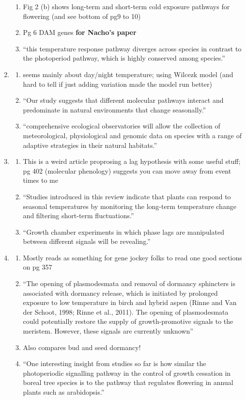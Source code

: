 \documentclass[11pt,letter]{article}
\begin{document}
\begin{enumerate}
\begin{enumerate}
\item Fig 2 (b) shows long-term and short-term cold exposure pathways for flowering (and see bottom of pg9 to 10)
\item Pg 6 DAM genes {\bf for Nacho's paper}
\item ``this temperature response pathway diverges across species in contrast to the photoperiod pathway, which is highly conserved among species.''
\end{enumerate} 
\item \cite{Chew:2012pd} 
\begin{enumerate} 
\item seems mainly about day/night temperature; using Wilcezk model (and hard to tell if just adding variation made the model run better) 
\item ``Our study suggests that different molecular pathways interact and predominate in natural environments that change seasonally.''
\item ``comprehensive ecological observatories will allow the collection of meteorological, physiological and genomic data on species with a range of adaptive strategies in their natural habitats.''
\end{enumerate} 
\item \cite{kudoh2016} 
\begin{enumerate} 
\item This is a weird article proprosing a lag hypothesis with some useful stuff; pg 402 (molecular phenology) suggests you can move away from event times to me
\item ``Studies introduced in this review indicate that plants can respond to seasonal temperatures by monitoring the long-term temperature  change and filtering short-term fluctuations.''
\item ``Growth chamber experiments in which phase lags are manipulated between different signals will be revealing.''
\end{enumerate} 
\item \cite{Maurya2017}
\begin{enumerate} 
\item Mostly reads as something for gene jockey folks to read one good sections on pg 357 
\item ``The opening of plasmodesmata and removal of dormancy sphincters is associated with dormancy release, which is initiated by prolonged exposure to low temperature in birch and hybrid aspen (Rinne and Van der Schoot, 1998; Rinne
et al., 2011). The opening of plasmodesmata could potentially restore the supply of growth-promotive signals to the meristem. However, these signals are currently unknown''
\item Also compares bud and seed dormancy!
\item ``One interesting insight from studies so far is how similar the photoperiodic signalling pathway in the control of growth cessation in boreal tree species is to the pathway that regulates flowering in annual plants such as arabidopsis.''
\end{enumerate} 
\end{enumerate} 


\end{document}
